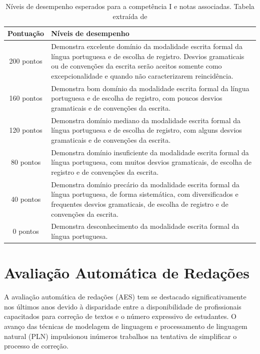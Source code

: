 \begin{table}[H]
    \centering
    \caption{Níveis de desempenho esperados para a competência I e notas associadas. Tabela extraída de \cite[p.~10]{cartilha-redacao}}
    \label{tab:competencia-1}
    \begin{tabularx}{\textwidth}{|c|X|}
        \hline
        \textbf{Pontuação} & \textbf{Níveis de desempenho} \\
        \hline
        200 pontos & Demonstra excelente domínio da modalidade escrita formal da língua portuguesa e de escolha de registro. Desvios gramaticais ou de convenções da escrita serão aceitos somente como excepcionalidade e quando não caracterizarem reincidência. \\
        \hline
        160 pontos & Demonstra bom domínio da modalidade escrita formal da língua portuguesa e de escolha de registro, com poucos desvios gramaticais e de convenções da escrita. \\
        \hline
        120 pontos & Demonstra domínio mediano da modalidade escrita formal da língua portuguesa e de escolha de registro, com alguns desvios gramaticais e de convenções da escrita. \\
        \hline
        80 pontos & Demonstra domínio insuficiente da modalidade escrita formal da língua portuguesa, com muitos desvios gramaticais, de escolha de registro e de convenções da escrita. \\
        \hline
        40 pontos & Demonstra domínio precário da modalidade escrita formal da língua portuguesa, de forma sistemática, com diversificados e frequentes desvios gramaticais, de escolha de registro e de convenções da escrita. \\
        \hline
        0 pontos & Demonstra desconhecimento da modalidade escrita formal da língua portuguesa. \\
        \hline
    \end{tabularx}
\end{table}

\section{Avaliação Automática de Redações}

A avaliação automática de redações (AES) tem se destacado significativamente nos últimos anos devido à disparidade entre a disponibilidade de profissionais capacitados para correção de textos e o número expressivo de estudantes. O avanço das técnicas de modelagem de linguagem e processamento de linguagem natural (PLN) impulsionou inúmeros trabalhos na tentativa de simplificar o processo de correção.


